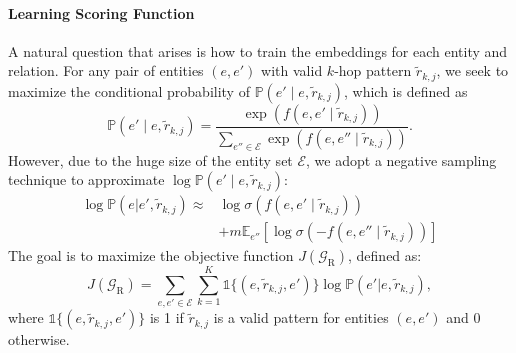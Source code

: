 \documentclass[sigconf]{acmart}
\begin{document}
\paragraph{Learning Scoring Function}
A natural question that arises is how to train the embeddings for each entity and relation. 
For any pair of entities $(e,e')$ with valid $k$-hop pattern $\tilde{r}_{k,j}$, we seek to maximize the conditional probability of $\mathds{P}(e' \mid e,\tilde{r}_{k,j})$, which is defined as
\begin{equation}
\mathds{P}(e'\mid e,\tilde{r}_{k,j})=\frac{\exp{\left( f(e,e'\mid\tilde{r}_{k,j}) \right)}}{\sum_{e''\in\mathcal{E}}\exp{\left( f(e,e''\mid\tilde{r}_{k,j}) \right)}}.
\end{equation}
However, due to the huge size of the entity set $\mathcal{E}$, we adopt a negative sampling technique \cite{mikolov2013distributed} to approximate $\log\mathds{P}(e'\mid e,\tilde{r}_{k,j})$:
\begin{align}
\log \mathds{P}(e|e',\tilde{r}_{k,j})\approx &\log\sigma\left(f(e,e'\mid \tilde{r}_{k,j})\right)  \nonumber\\
& +m\mathds{E}_{e''}\left[\log\sigma\left(-f(e,e''\mid\tilde{r}_{k,j})\right)\right]
\end{align}
The goal is to maximize the objective function $J(\mathcal{G}_\text{R})$, defined as:
\begin{equation}\label{eq:embed_obj}
J(\mathcal{G}_\text{R}) = \sum_{e,e'\in\mathcal{E}}\sum_{k=1}^{K}\mathds{1}\{(e,\tilde{r}_{k,j},e')\}\log\mathds{P}(e'|e,\tilde{r}_{k,j}),
\end{equation}
where $\mathds{1}\{(e,\tilde{r}_{k,j},e')\}$ is 1 if $\tilde{r}_{k,j}$ is a valid pattern for entities $(e,e')$ and 0 otherwise.
\end{document}
